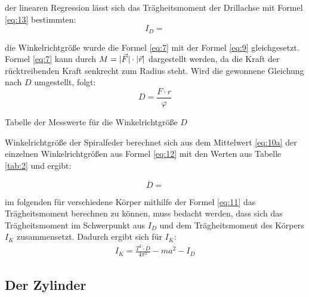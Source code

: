 \justifying der linearen Regression lässt sich das Trägheitsmoment der Drillachse mit Formel \eqref{eq:13} bestimmten:
\begin{equation}
I_D = \label{eq:15} %
\end{equation}


\justifying die Winkelrichtgröße wurde die Formel \eqref{eq:7} mit der Formel \eqref{eq:9} gleichgesetzt. Formel \eqref{eq:7} kann durch $M = \lvert\vec{F}\rvert \cdot \lvert\vec{r}\rvert$
dargestellt werden, da die Kraft der rücktreibenden Kraft senkrecht zum Radius steht. Wird die gewonnene Gleichung nach $D$ umgestellt, folgt:
\begin{equation}
D = \frac{F\cdot r}{\varphi}\label{eq:16}
\end{equation}

\begin{table}[H]
    \centering
    
    \caption{Tabelle der Messwerte für die Winkelrichtgröße $D$}
    \label{tab:2}
\end{table}


\justifying Winkelrichtgröße der Spiralfeder berechnet sich aus dem Mittelwert \eqref{eq:10a} der einzelnen Winkelrichtgrößen aus 
Formel \eqref{eq:12} mit den Werten aus Tabelle \ref{tab:2} und ergibt:

\begin{equation}
\overline{D} = \text{} \label{eq:17} %
\end{equation}

 im folgenden für verschiedene Körper mithilfe der Formel \eqref{eq:11} das Trägheitsmoment
berechnen zu können, muss bedacht werden, dass sich das Trägheitsmoment im Schwerpunkt 
aus $I_D$ und dem Trägheitsmoment des Körpers $I_K$ zusammensetzt. Dadurch ergibt sich 
für $I_K$:
\begin{align}
    I_K = \frac{T^2 \cdot D}{4 \pi^2}-ma^2-I_D
\end{align}

\subsection{Der Zylinder}\justifying %

